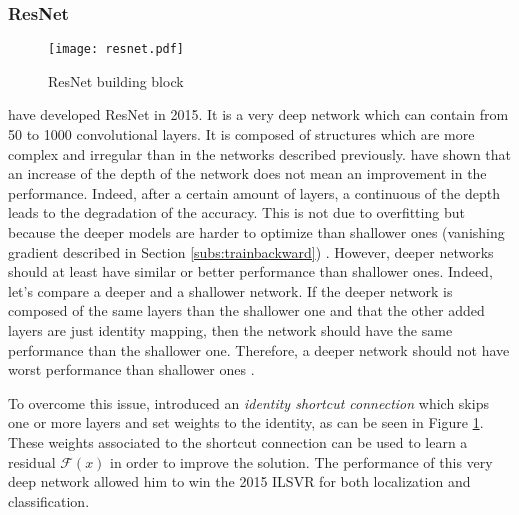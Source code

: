 \subsubsection{ResNet}
%
\begin{figure}
    \centering
    \texttt{[image: resnet.pdf]}
    \caption{ResNet building block \cite{he_deep_2015}}
    \label{fig:resnet}
\end{figure}
%
\textcite{he_deep_2015} have developed ResNet in 2015. It is a very deep network which can contain from 50 to 1000 convolutional layers. It is composed of structures which are more complex and irregular than in the networks described previously. \textcite{he_deep_2015} have shown that an increase of the depth of the network does not mean an improvement in the performance. Indeed, after a certain amount of layers, a continuous of the depth leads to the degradation of the accuracy. This is not due to overfitting but because the deeper models are harder to optimize than shallower ones (vanishing gradient described in Section \ref{subs:trainbackward}) \cite{matteucci_artificial_2019}. However, deeper networks should at least have similar or better performance than shallower ones. Indeed, let’s compare a deeper and a shallower network. If the deeper network is composed of the same layers than the shallower one and that the other added layers are just identity mapping, then the network should have the same performance than the shallower one. Therefore, a deeper network should not have worst performance than shallower ones \cite{matteucci_artificial_2019}.

To overcome this issue, \textcite{he_deep_2015} introduced an \textit{identity shortcut connection} which skips one or more layers and set weights to the identity, as can be seen in Figure \ref{fig:resnet}. These weights associated to the shortcut connection can be used to learn a residual $\mathcal{F}(x)$ in order to improve the solution. The performance of this very deep network allowed him to win the 2015 ILSVR for both localization and classification.
%
